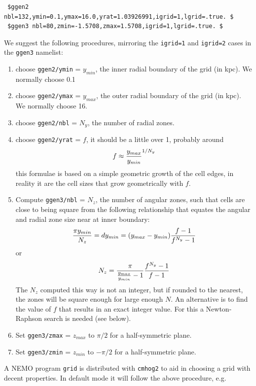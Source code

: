 \documentclass[10pt,dvips]{article}
\begin{document}
\begin{verbatim}
 $ggen2 nbl=132,ymin=0.1,ymax=16.0,yrat=1.03926991,igrid=1,lgrid=.true. $
 $ggen3 nbl=80,zmin=-1.5708,zmax=1.5708,igrid=1,lgrid=.true. $
\end{verbatim}


We suggest the following procedures, mirroring the {\tt igrid=1} and 
{\tt igrid=2} cases in the {\tt ggen3} namelist:

\begin{enumerate}
\item
choose  {\tt ggen2/ymin} = $y_{min}$, the inner radial 
boundary of the grid (in kpc). We normally choose 0.1

\item
choose {\tt ggen2/ymax} = $y_{max}$, the outer radial 
boundary of the grid (in kpc). We normally choose 16.

\item
choose {\tt ggen2/nbl} = $N_y$, the number of radial zones.

\item
choose {\tt ggen2/yrat} = $f$, it should be a little over 1,
probably around
$$
	 f \approx {y_{max} \over y_{min}}^{1/{N_y}}
$$
this formulae is based on a simple geometric growth of the cell edges, in reality
it are the cell sizes that grow geometrically with $f$.

\item
Compute {\tt ggen3/nbl} = $N_z$, the number of angular zones, such that cells are 
close to being square from the following relationship that equates the angular
and radial zone size near at inner boundary:
$$
   {{\pi y_{min}} \over N_z} = dy_{min} = (y_{max}-y_{min}) { {f-1} \over {f^{N_y}-1} }
$$
or
$$
N_z =   {  {\pi}   \over  { {y_{max} \over y_{min}}  - 1 } }  { {f^{N_y}-1} \over {f-1} }
$$
The $N_z$ computed this way is not an integer, but if rounded to the nearest, the zones will be
square enough for large enough $N$.
An alternative is to find the value of $f$ that results in an exact integer
value. For this a Newton-Raphson search is needed (see below). 
\item
Set {\tt ggen3/zmax} = $z_{max}$  to $\pi/2$ for a half-symmetric plane.

\item
Set {\tt ggen3/zmin} = $z_{min}$ to $-\pi/2$ for a half-symmetric plane.


\end{enumerate}

A NEMO program {\tt grid} is distributed with {\tt cmhog2} to aid
in choosing a grid with decent properties. In default mode it will follow the above procedure, e.g.
\end{document}
